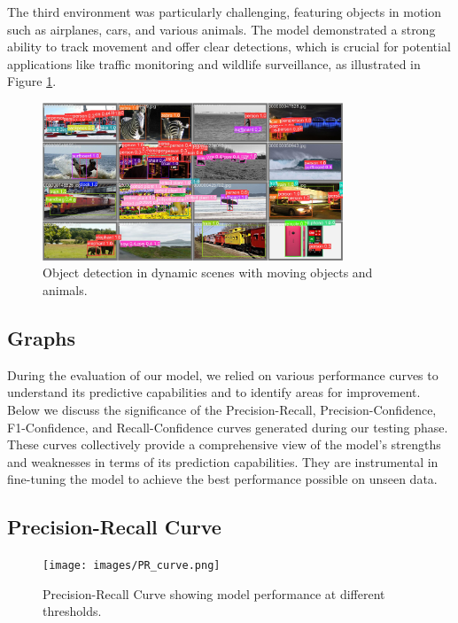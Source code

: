 \documentclass[10pt]{extarticle}
\begin{document}
The third environment was particularly challenging, featuring objects in motion such as airplanes, cars, and various animals. The model demonstrated a strong ability to track movement and offer clear detections, which is crucial for potential applications like traffic monitoring and wildlife surveillance, as illustrated in Figure \ref{fig:moving_objects}.

\begin{figure}[H]
\centering
\includegraphics[width=0.8\textwidth]{images/val_batch2_pred.jpg}
\caption{Object detection in dynamic scenes with moving objects and animals.}
\label{fig:moving_objects}
\end{figure}

\subsection{Graphs}

During the evaluation of our model, we relied on various performance curves to understand its predictive capabilities and to identify areas for improvement. Below we discuss the significance of the Precision-Recall, Precision-Confidence, F1-Confidence, and Recall-Confidence curves generated during our testing phase. These curves collectively provide a comprehensive view of the model's strengths and weaknesses in terms of its prediction capabilities. They are instrumental in fine-tuning the model to achieve the best performance possible on unseen data.

\subsection{Precision-Recall Curve}

\begin{figure}[H]
    \centering
    \texttt{[image: images/PR\_curve.png]}
    \caption{Precision-Recall Curve showing model performance at different thresholds.}
    \label{fig:pr_curve}
    \end{figure}
\end{document}
